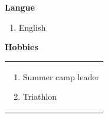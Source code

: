 \documentclass[a4paper,11pt,final]{memoir}
\newcommand{\SmallSep}{\vspace{0.2em}}
\newcommand{\CVSection}[1]
	{\Large\textbf{#1}\par
	\normalsize\normalfont}
\begin{document}
\noindent


\begin{multicols}{2}
\CVSection{Langue }
\begin{enumerate}[ \color{RoyalBlue}$\circ$]
  \item English\\
\end{enumerate}
\columnbreak

\CVSection{Hobbies}
\begin{tabular}{|p{\textwidth}}

\begin{enumerate}[\color{RoyalBlue}$\circ$]
  \item Summer camp leader
  \item Triathlon
\end{enumerate}

\end{tabular}
\end{multicols}

\SmallSep
\framebreak



\end{document}
